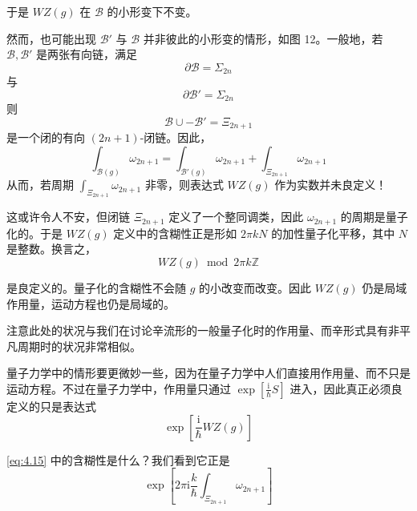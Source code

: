 于是 $WZ(g)$ 在 $\mathcal{B}$ 的小形变下不变。

然而，也可能出现 $\mathcal{B}'$ 与 $\mathcal{B}$ 并非彼此的小形变的情形，如图 12。一般地，若 $\mathcal{B},\mathcal{B}'$ 是两张有向链，满足
\begin{equation}
  \partial\mathcal{B}=\Sigma_{2n}
  \tag{4.10}
  \label{eq:4.10}
\end{equation}
与
\begin{equation}
  \partial\mathcal{B}'=\Sigma_{2n}
  \tag{4.11}
  \label{eq:4.11}
\end{equation}
则
\begin{equation}
  \mathcal{B}\cup-\mathcal{B}'=\Xi_{2n+1}
  \tag{4.12}
  \label{eq:4.12}
\end{equation}
是一个闭的有向 $(2n+1)$-闭链。因此，
\begin{equation}
  \int_{\mathcal{B}(g)}\omega_{2n+1}=\int_{\mathcal{B}'(g)}\omega_{2n+1}+\int_{\Xi_{2n+1}}\omega_{2n+1}
  \tag{4.13}
  \label{eq:4.13}
\end{equation}
从而，若周期 $\int_{\Xi_{2n+1}}\omega_{2n+1}$ 非零，则表达式 $WZ(g)$ 作为实数并未良定义！

这或许令人不安，但闭链 $\Xi_{2n+1}$ 定义了一个整同调类，因此 $\omega_{2n+1}$ 的周期是量子化的。于是 $WZ(g)$ 定义中的含糊性正是形如 $2\pi kN$ 的加性量子化平移，其中 $N$ 是整数。换言之，
\begin{equation}
  WZ(g)\bmod 2\pi k\mathbb{Z}
  \tag{4.14}
  \label{eq:4.14}
\end{equation}

是良定义的。量子化的含糊性不会随 $g$ 的小改变而改变。因此 $WZ(g)$ 仍是局域作用量，运动方程也仍是局域的。

注意此处的状况与我们在讨论辛流形的一般量子化时的作用量、而辛形式具有非平凡周期时的状况非常相似。

量子力学中的情形要更微妙一些，因为在量子力学中人们直接用作用量、而不只是运动方程。不过在量子力学中，作用量只通过 $\exp[\frac{\mathrm{i}}{\hbar}S]$ 进入，因此真正必须良定义的只是表达式
\begin{equation}
  \exp\left[\frac{\mathrm{i}}{\hbar}WZ(g)\right]
  \tag{4.15}
  \label{eq:4.15}
\end{equation}

\eqref{eq:4.15} 中的含糊性是什么？我们看到它正是
\begin{equation}
  \exp\left[2\pi\mathrm{i}\frac{k}{\hbar}\int_{\Xi_{2n+1}}\omega_{2n+1}\right]
  \tag{4.16}
  \label{eq:4.16}
\end{equation}


